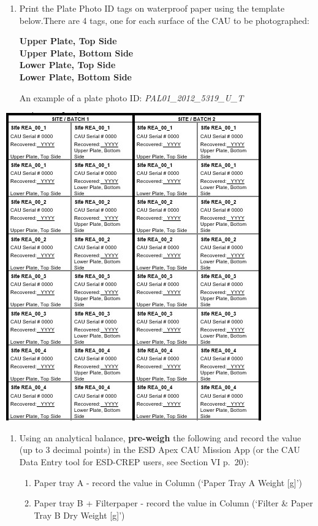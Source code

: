 \documentclass[]{book}
\providecommand{\tightlist}{%
  \setlength{\itemsep}{0pt}\setlength{\parskip}{0pt}}
\begin{document}
\begin{enumerate}
\def\labelenumi{\arabic{enumi}.}
\setcounter{enumi}{4}
\item
  Print the Plate Photo ID tags on waterproof paper using the template below.There are 4 tags, one for each surface of the CAU to be photographed:

  \textbf{Upper Plate, Top Side}\\
  \textbf{Upper Plate, Bottom Side}\\
  \textbf{Lower Plate, Top Side}\\
  \textbf{Lower Plate, Bottom Side}

  An example of a plate photo ID: \emph{PAL01\_2012\_5319\_U\_T}
\end{enumerate}

\includegraphics{images/Template2.jpg}

\begin{enumerate}
\def\labelenumi{\arabic{enumi}.}
\setcounter{enumi}{5}
\item
  Using an analytical balance, \textbf{pre-weigh} the following and record the value (up to 3 decimal points) in the ESD Apex CAU Mission App (or the CAU Data Entry tool for ESD-CREP users, see Section VI p.~20):

  \begin{enumerate}
  \def\labelenumii{\alph{enumii}.}
  \tightlist
  \item
    Paper tray A - record the value in Column (`Paper Tray A Weight {[}g{]}')\\
  \item
    Paper tray B + Filterpaper - record the value in Column (`Filter \& Paper Tray B Dry Weight {[}g{]}')
  \end{enumerate}
\end{enumerate}
\end{document}
